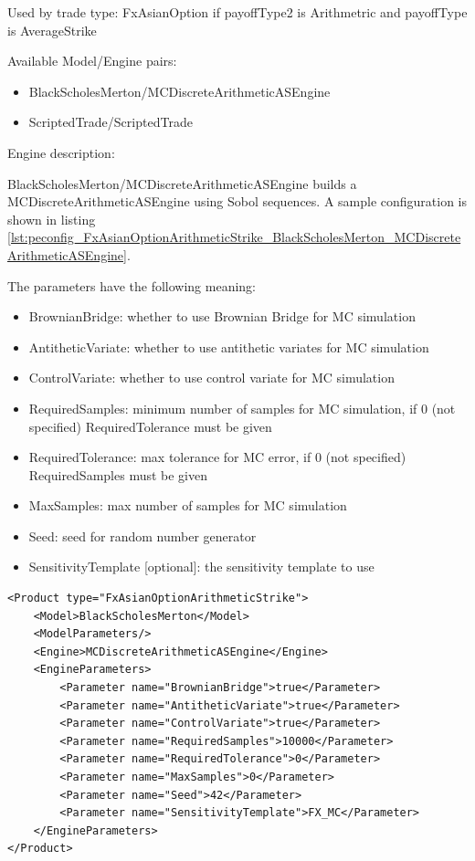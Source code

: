 Used by trade type: FxAsianOption if payoffType2 is Arithmetric and payoffType is AverageStrike

Available Model/Engine pairs:

\begin{itemize}
\item BlackScholesMerton/MCDiscreteArithmeticASEngine
\item ScriptedTrade/ScriptedTrade
\end{itemize}

Engine description:

BlackScholesMerton/MCDiscreteArithmeticASEngine builds a MCDiscreteArithmeticASEngine using Sobol sequences. A sample
configuration is shown in listing
\ref{lst:peconfig_FxAsianOptionArithmeticStrike_BlackScholesMerton_MCDiscreteArithmeticASEngine}.

The parameters have the following meaning:

\begin{itemize}
\item BrownianBridge: whether to use Brownian Bridge for MC simulation
\item AntitheticVariate: whether to use antithetic variates for MC simulation
\item ControlVariate: whether to use control variate for MC simulation
\item RequiredSamples: minimum number of samples for MC simulation, if 0 (not specified) RequiredTolerance must be given
\item RequiredTolerance: max tolerance for MC error, if 0 (not specified) RequiredSamples must be given
\item MaxSamples: max number of samples for MC simulation
\item Seed: seed for random number generator
\item SensitivityTemplate [optional]: the sensitivity template to use
\end{itemize}

\begin{longlisting}
\begin{verbatim}
<Product type="FxAsianOptionArithmeticStrike">
    <Model>BlackScholesMerton</Model>
    <ModelParameters/>
    <Engine>MCDiscreteArithmeticASEngine</Engine>
    <EngineParameters>
        <Parameter name="BrownianBridge">true</Parameter>
        <Parameter name="AntitheticVariate">true</Parameter>
        <Parameter name="ControlVariate">true</Parameter>
        <Parameter name="RequiredSamples">10000</Parameter>
        <Parameter name="RequiredTolerance">0</Parameter>
        <Parameter name="MaxSamples">0</Parameter>
        <Parameter name="Seed">42</Parameter>
        <Parameter name="SensitivityTemplate">FX_MC</Parameter>
    </EngineParameters>
</Product>
\end{verbatim}
\caption{Configuration for Product FxAsianOptionArithmeticStrike, Model BlackScholesMerton, Engine MCDiscreteArithmeticASEngine}
\label{lst:peconfig_FxAsianOptionArithmeticStrike_BlackScholesMerton_MCDiscreteArithmeticASEngine}
\end{longlisting}

